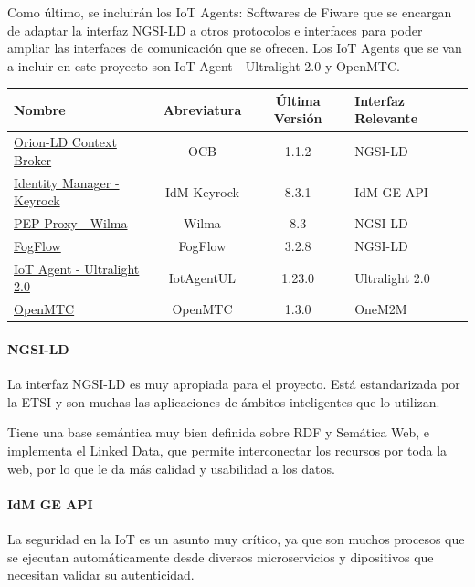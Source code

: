 \documentclass[12pt, a4paper, twoside]{article}
\begin{document}
Como último, se incluirán los IoT Agents: Softwares de Fiware que se encargan de adaptar la interfaz NGSI-LD a otros protocolos
e interfaces para poder ampliar las interfaces de comunicación que se ofrecen. Los IoT Agents que se van a incluir en este proyecto
son IoT Agent - Ultralight 2.0 y OpenMTC.
\begin{table}
  \footnotesize
  \begin{tabular}{ |l|c|c|l| } 
   \hline
   Nombre                                                                        & Abreviatura & Última Versión & Interfaz Relevante \\ \hline
   \href{https://github.com/FIWARE/context.Orion-LD}{Orion-LD Context Broker}     & OCB         & 1.1.2          & NGSI-LD \\ \hline 
   \href{https://github.com/ging/fiware-idm}{Identity Manager - Keyrock}          & IdM Keyrock & 8.3.1          & IdM GE API \\ \hline
   \href{https://github.com/ging/fiware-pep-proxy}{PEP Proxy - Wilma}             & Wilma       & 8.3            & NGSI-LD \\ \hline
   \href{https://github.com/smartfog/fogflow}{FogFlow}                            & FogFlow     & 3.2.8          & NGSI-LD \\ \hline
   \href{https://github.com/telefonicaid/iotagent-ul}{IoT Agent - Ultralight 2.0} & IotAgentUL  & 1.23.0         & Ultralight 2.0 \\ \hline
   \href{https://github.com/OpenMTC/OpenMTC}{OpenMTC}                             & OpenMTC     & 1.3.0          & OneM2M \\ \hline
  \end{tabular}
\end{table}

\paragraph{NGSI-LD}
La interfaz NGSI-LD es muy apropiada para el proyecto. Está estandarizada por la ETSI y
son muchas las aplicaciones de ámbitos inteligentes que lo utilizan.

Tiene una base semántica muy bien definida sobre RDF y Semática Web, e implementa el Linked Data, 
que permite interconectar los recursos por toda la web, por lo que le da más calidad y usabilidad
a los datos.
\paragraph{IdM GE API}
La seguridad en la IoT es un asunto muy crítico, ya que son muchos procesos que se ejecutan automáticamente
desde diversos microservicios y dipositivos que necesitan validar su autenticidad.
\end{document}
